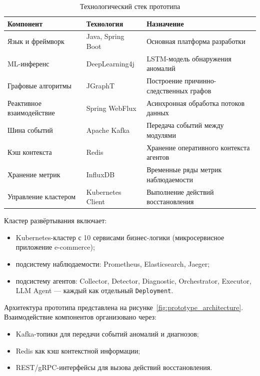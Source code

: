 \begin{table}[H]
\centering
\small
\caption{Технологический стек прототипа}
\label{tab:tech_stack}
\begin{tabular}{|p{3.5cm}|p{3.5cm}|p{7cm}|}
\hline
\textbf{Компонент} & \textbf{Технология} & \textbf{Назначение} \\
\hline
Язык и фреймворк & Java, Spring Boot & Основная платформа разработки \\
\hline
ML-инференс & DeepLearning4j & LSTM-модель обнаружения аномалий \\
\hline
Графовые алгоритмы & JGraphT & Построение причинно-следственных графов \\
\hline
Реактивное взаимодействие & Spring WebFlux & Асинхронная обработка потоков данных \\
\hline
Шина событий & Apache Kafka & Передача событий между модулями \\
\hline
Кэш контекста & Redis & Хранение оперативного контекста агентов \\
\hline
Хранение метрик & InfluxDB & Временные ряды метрик наблюдаемости \\
\hline
Управление кластером & Kubernetes Client & Выполнение действий восстановления \\
\hline
\end{tabular}
\end{table}

Кластер развёртывания включает:
\begin{itemize}
  \item Kubernetes-кластер с 10 сервисами бизнес-логики (микросервисное приложение e-commerce);
  \item подсистему наблюдаемости: Prometheus, Elasticsearch, Jaeger;
  \item подсистему агентов: Collector, Detector, Diagnostic, Orchestrator, Executor, LLM Agent --- каждый как отдельный \texttt{Deployment}.

\end{itemize}

Архитектура прототипа представлена на рисунке~\ref{fig:prototype_architecture}. Взаимодействие компонентов организовано через:
\begin{itemize}
  \item Kafka-топики для передачи событий аномалий и диагнозов;
  \item Redis как кэш контекстной информации;
  \item REST/gRPC-интерфейсы для вызова действий восстановления.

\end{itemize}

